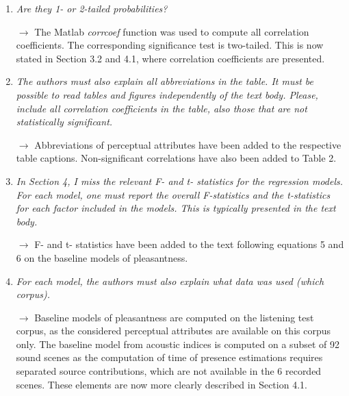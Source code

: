 \documentclass[10pt]{article}
\begin{document}
\begin{enumerate}
\item \emph{Are they 1- or 2-tailed probabilities?}

$\rightarrow$ The Matlab \textit{corrcoef} function was used to compute all correlation coefficients. The corresponding significance test is two-tailed. This is now stated in Section 3.2 and 4.1, where correlation coefficients are presented.

\item \emph{The authors must also explain all abbreviations in the table. It must be possible to read tables and figures independently of the text body. Please, include all correlation coefficients in the table, also those that are not statistically significant.}

$\rightarrow$ Abbreviations of perceptual attributes have been added to the respective table captions. Non-significant correlations have also been added to Table 2.

\item \emph{In Section 4, I miss the relevant F- and t- statistics for the regression models. For each model, one must report the overall F-statistics and the t-statistics for each factor included in the models. This is typically presented in the text body.}

$\rightarrow$ F- and t- statistics have been added to the text following equations 5 and 6 on the baseline models of pleasantness.

\item \emph{For each model, the authors must also explain what data was used (which corpus).}

$\rightarrow$ Baseline models of pleasantness are computed on the listening test corpus, as the considered perceptual attributes are available on this corpus only. The baseline model from acoustic indices is computed on a subset of 92 sound scenes as the computation of time of presence estimations requires separated source contributions, which are not available in the 6 recorded scenes. These elements are now more clearly described in Section 4.1.

\end{enumerate}





\end{document}

